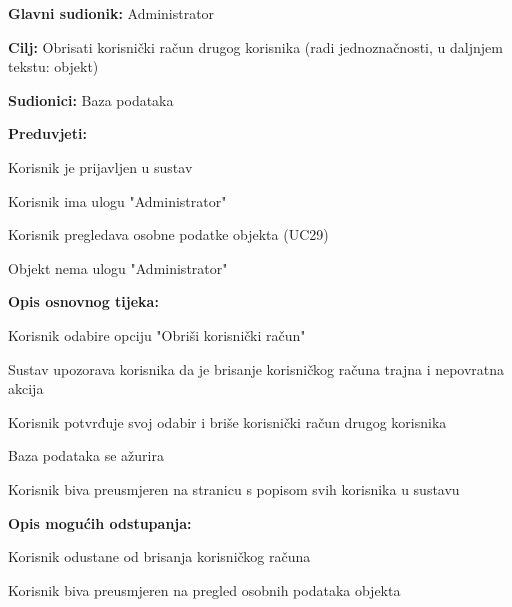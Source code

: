 					\noindent {}
					\begin{packed_item}
	
						\item \textbf{Glavni sudionik: }Administrator
						\item  \textbf{Cilj:} Obrisati korisnički račun drugog korisnika (radi jednoznačnosti, u daljnjem tekstu: objekt)
						\item  \textbf{Sudionici:} Baza podataka
						\item  \textbf{Preduvjeti:}
						\item[] \begin{packed_enum}
							\item Korisnik je prijavljen u sustav
							\item Korisnik ima ulogu "Administrator"
							\item Korisnik pregledava osobne podatke objekta (UC29)
							\item Objekt nema ulogu "Administrator"
						\end{packed_enum}
						\item  \textbf{Opis osnovnog tijeka:}
						
						\item[] \begin{packed_enum}
	
							\item Korisnik odabire opciju "Obriši korisnički račun"
							\item Sustav upozorava korisnika da je brisanje korisničkog računa trajna i nepovratna akcija
							\item Korisnik potvrđuje svoj odabir i briše korisnički račun drugog korisnika
							\item Baza podataka se ažurira
							\item Korisnik biva preusmjeren na stranicu s popisom svih korisnika u sustavu
						\end{packed_enum}
						
						\item  \textbf{Opis mogućih odstupanja:}
						
						\item[] \begin{packed_item}
	
							\item[3.a] Korisnik odustane od brisanja korisničkog računa
							\item[] \begin{packed_enum}
								
								\item Korisnik biva preusmjeren na pregled osobnih podataka objekta							
							\end{packed_enum}
							
						\end{packed_item}
					\end{packed_item}
					
